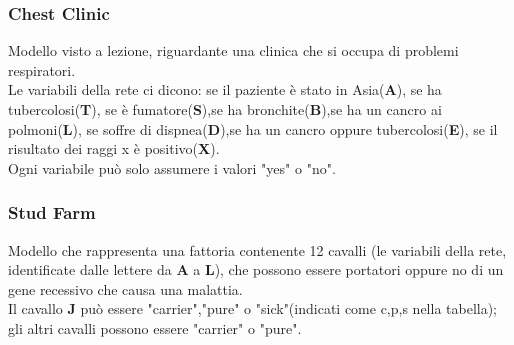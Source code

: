 \documentclass[a4paper]{article}
\begin{document}
\subsubsection{Chest Clinic}
Modello visto a lezione, riguardante una clinica che si occupa di problemi respiratori.\\
Le variabili della rete ci dicono: se il paziente è stato in Asia(\textbf{A}), se ha tubercolosi(\textbf{T}), se è fumatore(\textbf{S}),se ha bronchite(\textbf{B}),se ha un cancro ai polmoni(\textbf{L}), se soffre di dispnea(\textbf{D}),se ha un cancro oppure tubercolosi(\textbf{E}), se il risultato dei raggi x è positivo(\textbf{X}).\\
Ogni variabile può solo assumere i valori "yes" o "no".
\begin{table}[H]
\end{table}
\subsubsection{Stud Farm}
Modello che rappresenta una fattoria contenente 12 cavalli (le variabili della rete, identificate dalle lettere da \textbf{A} a \textbf{L}), che possono essere portatori oppure no di un gene recessivo che causa una malattia.\\
Il cavallo \textbf{J} può essere "carrier","pure" o "sick"(indicati come c,p,s nella tabella); gli altri cavalli possono essere "carrier" o "pure".
\begin{table}[H]
\end{table}
\end{document}
